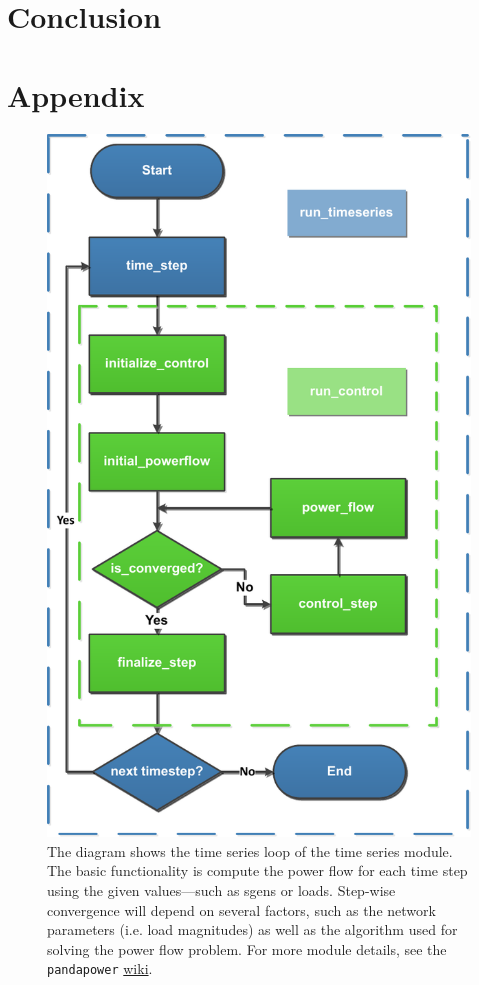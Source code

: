 \documentclass[a4paper,10pt]{report}
\begin{document}
\chapter{Conclusion}


\chapter*{Appendix}\label{chapter_appendix}

\begin{figure}[htpb]
	\centering
	\includegraphics[width=0.45\linewidth]{timeseries_module_diag.pdf}
	\caption{The diagram shows the time series loop of the time series module. The basic functionality is compute the power flow for each time step using the given values---such as sgens or loads. Step-wise convergence will depend on several factors, such as the network parameters (i.e. load magnitudes) as well as the algorithm used for solving the power flow problem. For more module details, see the \texttt{pandapower}  \href{https://pandapower.readthedocs.io/en/v2.10.1/timeseries/timeseries_loop.html}{wiki}.}
	\label{timeseries_module_diag}
\end{figure}
\end{document}
